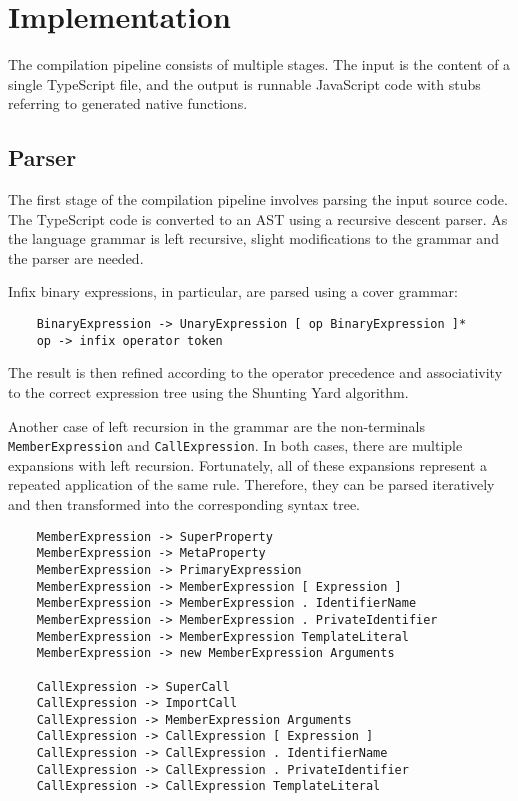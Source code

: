 \chapter{Implementation}

The compilation pipeline consists of multiple stages. The input is the content of a single TypeScript file, and the output is runnable JavaScript code with stubs referring to generated native functions.


\section{Parser}

The first stage of the compilation pipeline involves parsing the input source code. The TypeScript code is converted to an AST using a recursive descent parser. As the language grammar is left recursive, slight modifications to the grammar and the parser are needed.

Infix binary expressions, in particular, are parsed using a cover grammar:

\begin{verbatim}
    BinaryExpression -> UnaryExpression [ op BinaryExpression ]*
    op -> infix operator token
\end{verbatim}

The result is then refined according to the operator precedence and associativity to the correct expression tree using the Shunting Yard algorithm. \todo{}

Another case of left recursion in the grammar are the non-terminals \texttt{MemberExpression} and \texttt{CallExpression}. In both cases, there are multiple expansions with left recursion. Fortunately, all of these expansions represent a repeated application of the same rule. Therefore, they can be parsed iteratively and then transformed into the corresponding syntax tree.

\begin{verbatim}
    MemberExpression -> SuperProperty
    MemberExpression -> MetaProperty
    MemberExpression -> PrimaryExpression
    MemberExpression -> MemberExpression [ Expression ]
    MemberExpression -> MemberExpression . IdentifierName
    MemberExpression -> MemberExpression . PrivateIdentifier
    MemberExpression -> MemberExpression TemplateLiteral
    MemberExpression -> new MemberExpression Arguments

    CallExpression -> SuperCall
    CallExpression -> ImportCall
    CallExpression -> MemberExpression Arguments
    CallExpression -> CallExpression [ Expression ]
    CallExpression -> CallExpression . IdentifierName
    CallExpression -> CallExpression . PrivateIdentifier
    CallExpression -> CallExpression TemplateLiteral
\end{verbatim}


